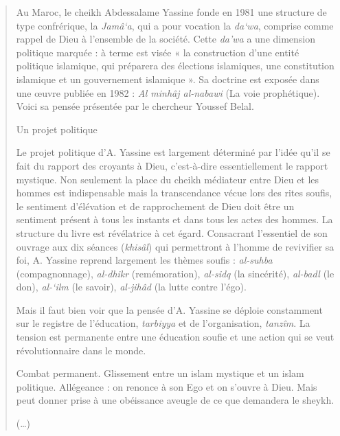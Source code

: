 \begin{quote}

Au Maroc, le cheikh Abdessalame Yassine fonde en 1981 une structure de
type confrérique, la \emph{Jamâ`a}, qui a pour vocation la \emph{da`wa}, comprise comme rappel de Dieu à l'ensemble de la société. Cette \emph{da'wa} a une dimension politique marquée : à terme est visée « la construction d'une entité politique islamique, qui préparera des
élections islamiques, une constitution islamique et un gouvernement islamique ». Sa doctrine est exposée dans une œuvre publiée en 1982 : \emph{Al minhâj al-nabawi} (La voie prophétique). Voici sa pensée présentée par le chercheur Youssef Belal.

\begin{Synthesis}
Un projet politique
\end{Synthesis}

Le projet politique d'A. Yassine est largement déterminé par l'idée qu'il se fait du rapport des croyants à Dieu, c'est-à-dire essentiellement le rapport mystique. Non seulement la place du cheikh médiateur entre Dieu et les hommes est indispensable mais la transcendance vécue lors des rites soufis, le sentiment d'élévation et
de rapprochement de Dieu doit être un sentiment présent à tous les instants et dans tous les actes des hommes. La structure du livre est révélatrice à cet égard. Consacrant l'essentiel de son ouvrage aux dix
séances (\emph{khisâl}) qui permettront à l'homme de revivifier sa foi,
A. Yassine reprend largement les thèmes soufis : \emph{al-suhba}
(compagnonnage), \emph{al-dhikr} (remémoration), \emph{al-sidq} (la
sincérité), \emph{al-badl} (le don), \emph{al-`ilm} (le savoir),
\emph{al-jihâd} (la lutte contre l'égo).

Mais il faut bien voir que la pensée d'A. Yassine se déploie constamment sur le registre de l'éducation, \emph{tarbiyya} et de l'organisation, \emph{tanzîm}. La tension est permanente entre une éducation soufie et une action qui se veut révolutionnaire dans le monde.


\begin{Synthesis}
Combat permanent. Glissement entre un islam mystique et un islam politique. 
Allégeance : on renonce à son Ego et on s'ouvre à Dieu. Mais peut donner prise à une obéissance aveugle de ce que demandera le sheykh.
\end{Synthesis}
(\ldots)


\end{quote}
